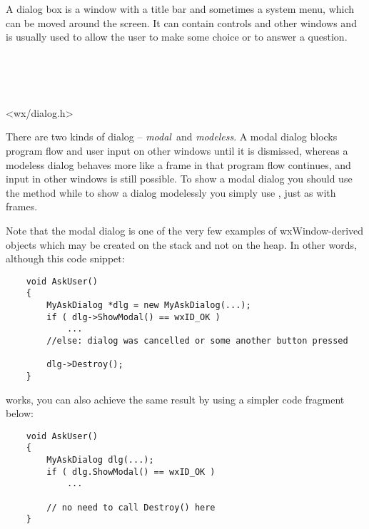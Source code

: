 \section{}\label{wxdialog}

A dialog box is a window with a title bar and sometimes a system menu, which
can be moved around the screen. It can contain controls and other windows and
is usually used to allow the user to make some choice or to answer a question.


\\
\\
\\


<wx/dialog.h>


There are two kinds of dialog -- {\it modal}\ and {\it modeless}. A modal dialog
blocks program flow and user input on other windows until it is dismissed,
whereas a modeless dialog behaves more like a frame in that program flow
continues, and input in other windows is still possible. To show a modal dialog
you should use the  method while to show
a dialog modelessly you simply use , just as with
frames.

Note that the modal dialog is one of the very few examples of
wxWindow-derived objects which may be created on the stack and not on the heap.
In other words, although this code snippet:

\begin{verbatim}
    void AskUser()
    {
        MyAskDialog *dlg = new MyAskDialog(...);
        if ( dlg->ShowModal() == wxID_OK )
            ...
        //else: dialog was cancelled or some another button pressed

        dlg->Destroy();
    }
\end{verbatim}

works, you can also achieve the same result by using a simpler code fragment
below:

\begin{verbatim}
    void AskUser()
    {
        MyAskDialog dlg(...);
        if ( dlg.ShowModal() == wxID_OK )
            ...

        // no need to call Destroy() here
    }
\end{verbatim}

